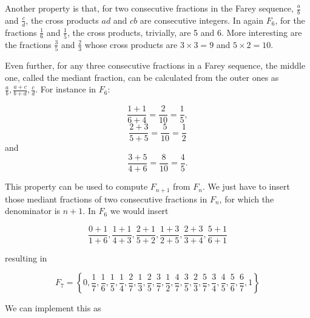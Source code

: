 \documentclass[tikz]{scrreprt}
\begin{document}
Another property is that, for two consecutive fractions
in the Farey sequence,
$\frac{a}{b}$ and $\frac{c}{d}$,
the cross products
$ad$ and $cb$ are consecutive integers.
In again $F_6$, 
for the fractions $\frac{1}{6}$ and $\frac{1}{5}$,
the cross products, trivially, are 5 and 6.
More interesting are 
the fractions $\frac{3}{5}$ and $\frac{2}{3}$ whose
cross products are $3\times 3 = 9$ and $5 \times 2 = 10$.

Even further, for any three consecutive fractions
in a Farey sequence, the middle one, called the mediant fraction,
can be calculated from the outer ones as
$\frac{a}{b}, \frac{a+c}{b+d}, \frac{c}{d}$.
For instance in $F_6$: 

\begin{equation}
 \frac{1+1}{6+4} = \frac{2}{10} = \frac{1}{5},
\end{equation}
\begin{equation}
 \frac{2+3}{5+5} = \frac{5}{10} = \frac{1}{2}
\end{equation}
and
\begin{equation}
 \frac{3+5}{4+6} = \frac{8}{10} = \frac{4}{5}.
\end{equation}

This property can be used to compute $F_{n+1}$ from $F_n$.
We just have to insert those mediant fractions 
of two consecutive fractions in $F_n$, for which
the denominator is $n+1$.
In $F_6$ we would insert

\[
\frac{0+1}{1+6},
\frac{1+1}{4+3},
\frac{2+1}{5+2},
\frac{1+3}{2+5},
\frac{2+3}{3+4},
\frac{5+1}{6+1}
\]

resulting in

\begin{equation}
F_7 = \left\lbrace 0, 
\frac{1}{7}, 
\frac{1}{6}, 
\frac{1}{5}, 
\frac{1}{4}, 
\frac{2}{7}, 
\frac{1}{3}, 
\frac{2}{5}, 
\frac{3}{7}, 
\frac{1}{2}, 
\frac{4}{7}, 
\frac{3}{5}, 
\frac{2}{3}, 
\frac{5}{7}, 
\frac{3}{4}, 
\frac{4}{5}, 
\frac{5}{6}, 
\frac{6}{7}, 
1\right\rbrace
\end{equation}

We can implement this as
\end{document}

